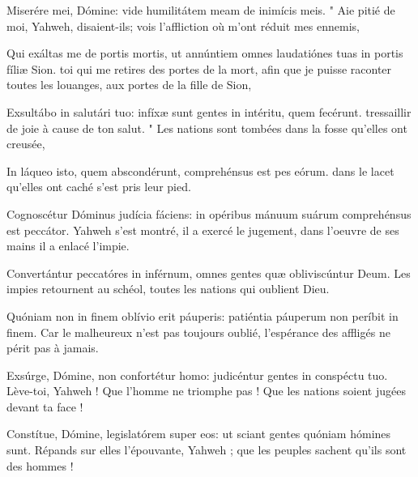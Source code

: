 
\begin{paracol}{2}

\LigneParacol{0cm}
{Miserére mei, Dómine: \GreStar{} vide humilitátem meam de inimícis meis.}
{" Aie pitié de moi, Yahweh, disaient-ils; vois l'affliction où m'ont réduit mes ennemis,}

\LigneParacol{0.2cm}
{Qui exáltas me de portis mortis, \GreStar{} ut annúntiem omnes laudatiónes tuas in portis fíliæ Sion.}
{toi qui me retires des portes de la mort, afin que je puisse raconter toutes les louanges, aux portes de la fille de Sion,}

\LigneParacol{0.2cm}
{Exsultábo in salutári tuo: \GreStar{} infíxæ sunt gentes in intéritu, quem fecérunt.}
{tressaillir de joie à cause de ton salut. " Les nations sont tombées dans la fosse qu'elles ont creusée,}

\LigneParacol{0.2cm}
{In láqueo isto, quem abscondérunt, \GreStar{} comprehénsus est pes eórum.}
{dans le lacet qu'elles ont caché s'est pris leur pied.}

\LigneParacol{0.2cm}
{Cognoscétur Dóminus judícia fá\-ciens: \GreStar{} in opéribus mánuum suárum comprehénsus est peccátor.}
{Yahweh s'est montré, il a exercé le jugement, dans l'oeuvre de ses mains il a enlacé l'impie.}

\LigneParacol{0.2cm}
{Convertántur peccatóres in inférnum, \GreStar{} omnes gentes quæ obliviscúntur Deum.}
{Les impies retournent au schéol, toutes les nations qui oublient Dieu.}

\LigneParacol{0.2cm}
{Quóniam non in finem oblívio erit páuperis: \GreStar{} patiéntia páuperum non períbit in finem.}
{Car le malheureux n'est pas toujours oublié, l'espérance des affligés ne périt pas à jamais. }

\LigneParacol{0.2cm}
{Exsúrge, Dómine, non confortétur homo: \GreStar{} judicéntur gentes in conspéctu tuo.}
{Lève-toi, Yahweh ! Que l'homme ne triomphe pas ! Que les nations soient jugées devant ta face ! }

\LigneParacol{0.2cm}
{Constítue, Dómine, legislatórem super eos: \GreStar{} ut sciant gentes quóniam hómines sunt.}
{Répands sur elles l'épouvante, Yahweh ; que les peuples sachent qu'ils sont des hommes !}

\end{paracol}
\Gloria
